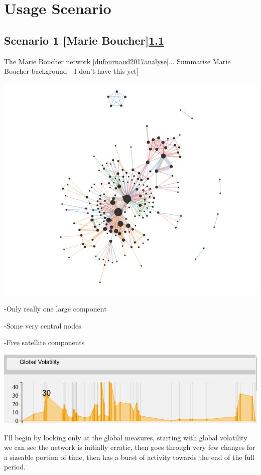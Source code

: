 
\chapter{Usage Scenario}

\section{Scenario 1 [Marie Boucher]\ref{}}
The Marie Boucher network \ref{dufournaud2017analyse}...
Summarise Marie Boucher background - I don't have this yet]

\begin{center}
\includegraphics[trim={0 0 0 0}, width=140mm]{./Figures/marieBoucherFull.png}
\end{center}

-Only really one large component

-Some very central nodes

-Five satellite components

\begin{center}
\includegraphics[trim={0 0 0 0}, width=140mm]{./Figures/marieBoucherGlobalVolatility.png}
\end{center}
I'll begin by looking only at the global measures, starting with global volatility we can see the network is initially erratic, then goes through very few changes for a sizeable portion of time, then has a burst of activity towards the end of the full period. 

